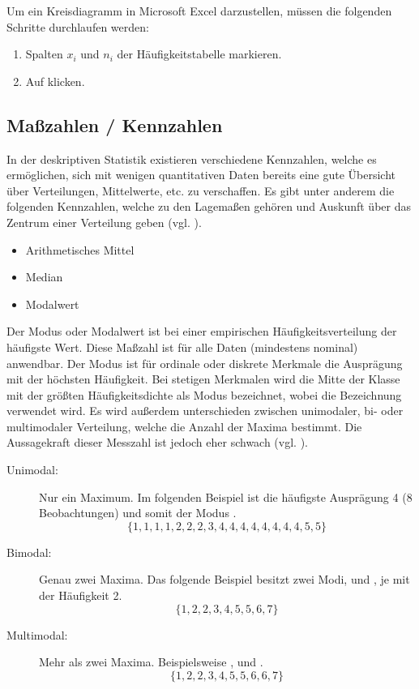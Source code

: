 Um ein Kreisdiagramm in Microsoft Excel darzustellen, müssen die folgenden Schritte durchlaufen
werden:

\begin{enumerate}
  \item Spalten $x_i$ und $n_i$ der Häufigkeitstabelle markieren.
  \item Auf  klicken.
\end{enumerate}



\subsection{Maßzahlen / Kennzahlen}
In der deskriptiven Statistik existieren verschiedene Kennzahlen, welche es ermöglichen, sich mit wenigen quantitativen Daten 
bereits eine gute Übersicht über Verteilungen, Mittelwerte, etc. zu verschaffen. 
Es gibt unter anderem die folgenden Kennzahlen, welche zu den Lagemaßen gehören und Auskunft über das Zentrum einer Verteilung geben (vgl. ).
\begin{itemize}
  	\item Arithmetisches Mittel
	\item Median
	\item Modalwert
\end{itemize}

Der Modus oder Modalwert ist bei einer empirischen Häufigkeitsverteilung der häufigste Wert. Diese
Maßzahl ist für alle Daten (mindestens nominal) anwendbar. Der Modus ist für ordinale oder diskrete
Merkmale die Ausprägung mit der höchsten Häufigkeit. Bei stetigen Merkmalen wird die Mitte der
Klasse mit der größten Häufigkeitsdichte als Modus bezeichnet, wobei die Bezeichnung  verwendet wird. Es wird außerdem unterschieden zwischen unimodaler, bi- oder multimodaler
Verteilung, welche die Anzahl der Maxima bestimmt. Die Aussagekraft dieser Messzahl ist jedoch eher schwach 
(vgl. ).
\begin{description}
  \item[Unimodal:] Nur ein Maximum. Im folgenden Beispiel ist die häufigste Ausprägung 4 (8
  Beobachtungen) und somit der Modus . \[\{1,1,1,1,2,2,2,3,4,4,4,4,4,4,4,4,5,5\}\]
  \item[Bimodal:] Genau zwei Maxima. Das folgende Beispiel besitzt zwei Modi, 
  und , je mit der Häufigkeit 2. \[\{1,2,2,3,4,5,5,6,7\}\]
  \item[Multimodal:] Mehr als zwei Maxima. Beispielsweise ,  und
  . \[\{1,2,2,3,4,5,5,6,6,7\}\]
\end{description} 

